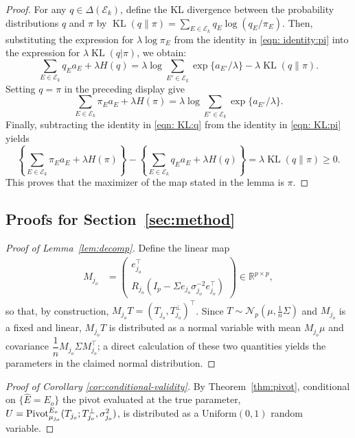 \documentclass[12pt]{article}
\newcommand{\Pivot}{\text{\normalfont Pivot}}
\newcommand{\nbracket}[1]{\left( #1 \right)}
\newcommand{\real}{\mathbb{R}}
\newcommand{\Ek}{\mathcal{E}_{k}}      %
\newcommand{\Ehat}{\widehat{E}}
\newcommand{\KL}{\operatorname{KL}}
\begin{document}
\begin{appendices}
\begin{proof}
For any $q \in \Delta(\Ek)$, define the KL divergence between the probability distributions $q$ and $\pi$ by
$\KL(q\|\pi)=\sum_{E\in\Ek}q_E\log(q_E/\pi_E)$. 
Then, substituting the expression for $\lambda\log\pi_E$ from the identity in \eqref{eqn: identity:pi} into the expression for $\lambda \KL(q|\pi)$, we obtain:
\begin{equation}
  \sum_{E\in\Ek}q_Ea_E+\lambda H(q)
  =
  \lambda\log\sum_{E'\in\Ek}\exp\{a_{E'}/\lambda\}
  -
  \lambda\KL(q\|\pi).
  \label{eqn: KL:q}
\end{equation}
Setting $q=\pi$ in the preceding display give
\begin{equation}
  \sum_{E\in\Ek}\pi_Ea_E+\lambda H(\pi)
  =
  \lambda\log\sum_{E'\in\Ek}\exp\{a_{E'}/\lambda\}.
  \label{eqn: KL:pi}
\end{equation} Finally, subtracting the identity in \eqref{eqn: KL:q} from the identity in \eqref{eqn: KL:pi} yields
\[
  \left\{
  \sum_{E\in\Ek}\pi_Ea_E+\lambda H(\pi)
  \right\}
  -
  \left\{
  \sum_{E\in\Ek}q_Ea_E+\lambda H(q)
  \right\}
  =
  \lambda\KL(q\|\pi)\ge 0.
\]
This proves that the maximizer of the map stated in the lemma is $\pi$.
\end{proof}


\subsection{Proofs for Section~\ref{sec:method}}

\begin{proof}[Proof of Lemma~\ref{lem:decomp}]
Define the linear map
\begin{align*}
  M_{j_o}
  &=
  \begin{pmatrix}
    e_{j_o}^\top \\[3pt]
    R_{j_o}\nbracket{I_p - \Sigma e_{j_o}\sigma_{j_o}^{-2}e_{j_o}^\top}
  \end{pmatrix}
  \in \real^{p\times p},
\end{align*}
so that, by construction, $M_{j_o}T = (T_{j_o}, T_{j_o}^\perp)^\top$.
Since $T \sim \mathcal {N}_p\nbracket{\mu, \tfrac{1}{n}\Sigma}$ and $M_{j_o}$ is a
fixed and linear, $M_{j_o}T$ is distributed as a normal variable with mean $M_{j_o}\mu$ and
covariance $\dfrac{1}{n}M_{j_o}\Sigma M_{j_o}^\top$; a direct calculation of these two quantities yields the parameters in the claimed normal distribution.
\end{proof}

\begin{proof}[Proof of Corollary \ref{cor:conditional-validity}]
By Theorem~\ref{thm:pivot}, conditional on $\{\Ehat = E_o\}$ the pivot evaluated at
the true parameter, $U = \Pivot^{E_o}_{\mu_{j_o}}(T_{j_o}; T_{j_o}^\perp, \sigma_{j_o}^2)$, is distributed as a $\mathrm{Uniform}(0,1)$ random variable. 


\end{proof}
\end{appendices}
\end{document}
